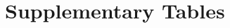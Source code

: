 \documentclass[10pt]{article}
\begin{document}

\section{Supplementary Tables}\label{Supplementary-Tables}

\setlength{\extrarowheight}{3pt}
\end{document}
